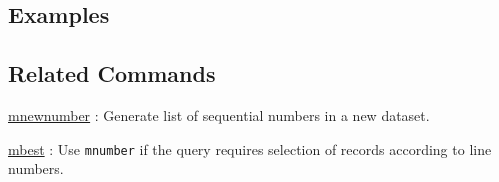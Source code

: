 \subsection*{Examples}


\subsection*{Related Commands}
\hyperref[sect:mnewnumber]{mnewnumber} :  Generate list of sequential numbers in a new dataset. 

\hyperref[sect:mbest]{mbest} : Use \verb|mnumber| if the query requires selection of records according to line numbers. 

%
